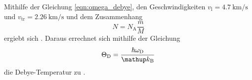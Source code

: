 Mithilfe der Gleichung \eqref{eqn:omega_debye}, den Geschwindigkeiten $v_\text{l}=\SI{4.7}{\kilo\meter\per\second}$ und $v_\text{tr}=\SI{2.26}{\kilo\meter\per\second}$ und dem Zusammenhang
\begin{equation*}
	N = N_\text{A} \frac{m}{M}
\end{equation*}
ergiebt sich .
Daraus errechnet sich mithilfe der Gleichung
\begin{equation*}
	\Theta_\text{D} = \frac{\hbar \omega_\text{D}}{\kb}
\end{equation*}
die Debye-Temperatur zu .